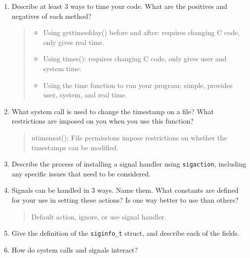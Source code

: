 \documentclass[letterpaper,10pt,onecolumn,titlepage]{article}
\begin{document}
\begin{enumerate}
\item Describe at least 3 ways to time your code. What are the positives and negatives of
  each method?

\begin{quote}
\begin{itemize}
    \item Using gettimeofday() before and after: requires changing C code, only gives real time.
    \item Using times(): requires changing C code, only gives user and system time.
    \item Using the time function to run your program: simple, provides user, system, and real time.
\end{itemize}
\end{quote}

\item What system call is used to change the timestamp on a file? What restrictions are
  imposed on you when you use this function?

\begin{quote}
    utimensat(); File permissions impose restrictions on whether the timestamps can be modified.
\end{quote}

\item Describe the process of installing a signal handler using \texttt{sigaction},
  including any specific issues that need to be considered.

\begin{quote}

\end{quote}

\item Signals can be handled in 3 ways. Name them. What constants are defined for your
  use in setting these actions? Is one way better to use than others?

\begin{quote}
    Default action, ignore, or use signal handler.
\end{quote}

\item Give the definition of the \texttt{siginfo\_t} struct, and describe each of the
  fields.

\begin{quote}

\end{quote}

\item How do system calls and signals interact?


\end{enumerate}
\end{document}
